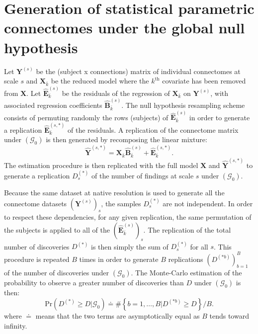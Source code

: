 \documentclass[authoryear,preprint,review]{elsarticle}
\begin{document}
\section{Generation of statistical parametric connectomes under the global null hypothesis}
Let $\mathbf{Y}^{(s)}$ be the (subject x connections) matrix of individual connectomes at scale $s$ and $\mathbf{X}_{\bar{k}}$ be the reduced model where the $k^\textrm{th}$ covariate has been removed from $\mathbf{X}$. Let $\hat{\mathbf{E}}^{(s)}_{\bar{k}}$ be the residuals of the regression of $\mathbf{X}_{\bar{k}}$ on $\mathbf{Y}^{(s)}$, with associated regression coefficients $\hat{\mathbf{B}}^{(s)}_{\bar{k}}$. The null hypothesis resampling scheme consists of permuting randomly the rows (subjects) of $\hat{\mathbf{E}}^{(s)}_{\bar{k}}$ in order to generate a replication $\hat{\mathbf{E}}^{(s,*)}_{\bar{k}}$ of the residuals. A replication 
of 
the connectome matrix under $(\mathcal{G}_0)$ is then generated by recomposing the linear mixture:
\begin{equation}
 \label{eq_samp_null}
 \hat{\mathbf{Y}}^{(s,*)} = \mathbf{X}_{\bar{k}} \hat{\mathbf{B}}^{(s)}_{\bar{k}} + \hat{\mathbf{E}}^{(s,*)}_{\bar{k}}.
\end{equation}
The estimation procedure is then replicated with the full model $\mathbf{X}$ and $\hat{\mathbf{Y}}^{(s,*)}$ to generate a replication $D^{(*)}_s$ of the number of findings at scale $s$ under $(\mathcal{G}_0)$.
\par
Because the same dataset at native resolution is used to generate all the connectome datasets $(\mathbf{Y}^{(s)})_s$, the samples $D^{(*)}_s$ are not independent. In order to respect these dependencies, for any given replication, the same permutation of the subjects is applied to all of the $(\hat{\mathbf{E}}^{(s)}_{\bar{k}})_s$. The replication of the total number of discoveries $D^{(*)}$ is then simply the sum of $D^{(*)}_s$ for all $s$. This procedure is repeated $B$ times in order to generate $B$ replications $(D^{(*b)})_{b=1}^B$ of the number of discoveries under $(\mathcal{G}_0)$. The Monte-Carlo estimation of the probability to observe a greater number of discoveries than $D$ under $(\mathcal{G}_0)$ is then:
\begin{equation}
 \label{eq_pce_disc}
 \textrm{Pr}(D^{(*)}\geq D | \mathcal{G}_0) \doteq \#\left\{b=1,\dots,B|D^{(*b)}\geq D\right\}/B.
\end{equation}
where $\doteq$ means that the two terms are asymptotically equal as $B$ tends toward infinity. 
\end{document}
